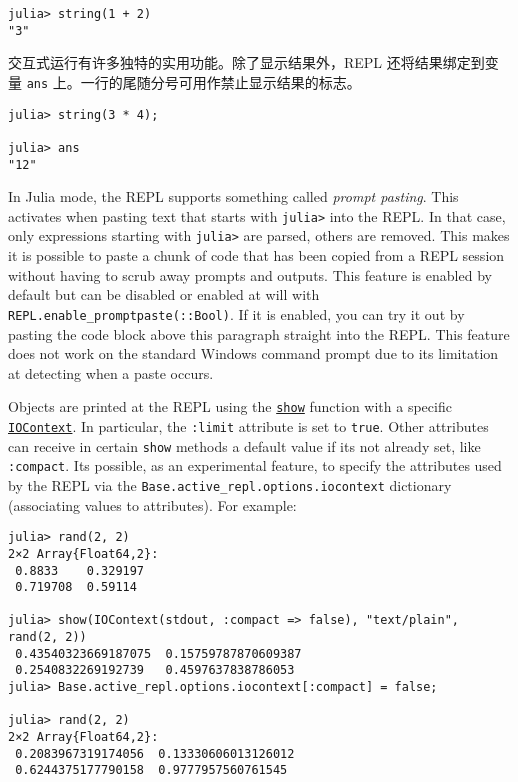 \begin{verbatim}
julia> string(1 + 2)
"3"
\end{verbatim}



交互式运行有许多独特的实用功能。除了显示结果外，REPL 还将结果绑定到变量 \texttt{ans} 上。一行的尾随分号可用作禁止显示结果的标志。




\begin{verbatim}
julia> string(3 * 4);

julia> ans
"12"
\end{verbatim}



In Julia mode, the REPL supports something called \emph{prompt pasting}. This activates when pasting text that starts with \texttt{julia>} into the REPL. In that case, only expressions starting with \texttt{julia>} are parsed, others are removed. This makes it is possible to paste a chunk of code that has been copied from a REPL session without having to scrub away prompts and outputs. This feature is enabled by default but can be disabled or enabled at will with \texttt{REPL.enable\_promptpaste(::Bool)}. If it is enabled, you can try it out by pasting the code block above this paragraph straight into the REPL. This feature does not work on the standard Windows command prompt due to its limitation at detecting when a paste occurs.



Objects are printed at the REPL using the \hyperlink{14071376285304310153}{\texttt{show}} function with a specific \hyperlink{13454403377667762339}{\texttt{IOContext}}. In particular, the \texttt{:limit} attribute is set to \texttt{true}. Other attributes can receive in certain \texttt{show} methods a default value if it{\textquotesingle}s not already set, like \texttt{:compact}. It{\textquotesingle}s possible, as an experimental feature, to specify the attributes used by the REPL via the \texttt{Base.active\_repl.options.iocontext} dictionary (associating values to attributes). For example:




\begin{verbatim}
julia> rand(2, 2)
2×2 Array{Float64,2}:
 0.8833    0.329197
 0.719708  0.59114

julia> show(IOContext(stdout, :compact => false), "text/plain", rand(2, 2))
 0.43540323669187075  0.15759787870609387
 0.2540832269192739   0.4597637838786053
julia> Base.active_repl.options.iocontext[:compact] = false;

julia> rand(2, 2)
2×2 Array{Float64,2}:
 0.2083967319174056  0.13330606013126012
 0.6244375177790158  0.9777957560761545
\end{verbatim}



